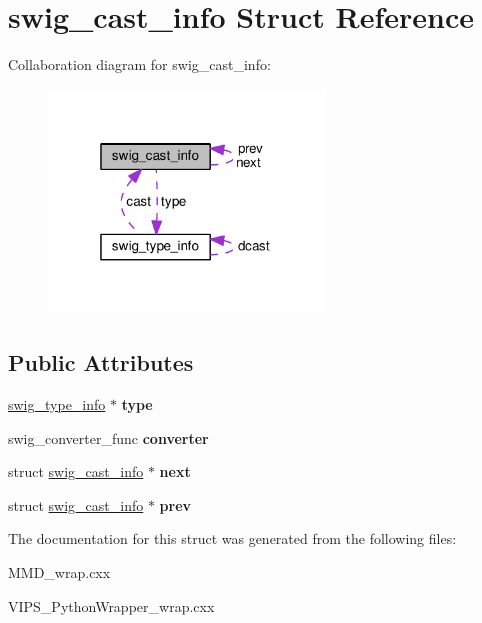 \hypertarget{structswig__cast__info}{}\section{swig\+\_\+cast\+\_\+info Struct Reference}
\label{structswig__cast__info}


Collaboration diagram for swig\+\_\+cast\+\_\+info\+:\nopagebreak
\begin{figure}[H]
\begin{center}
\leavevmode
\includegraphics[width=208pt]{structswig__cast__info__coll__graph}
\end{center}
\end{figure}
\subsection*{Public Attributes}
\begin{DoxyCompactItemize}
\item 
\hyperlink{structswig__type__info}{swig\+\_\+type\+\_\+info} $\ast$ {\bfseries type}\hypertarget{structswig__cast__info_a06b74832d16cc0c4fd147e4c39095cd9}{}\label{structswig__cast__info_a06b74832d16cc0c4fd147e4c39095cd9}

\item 
swig\+\_\+converter\+\_\+func {\bfseries converter}\hypertarget{structswig__cast__info_aa630fddfbb1bf9c97a03f9479ba32f76}{}\label{structswig__cast__info_aa630fddfbb1bf9c97a03f9479ba32f76}

\item 
struct \hyperlink{structswig__cast__info}{swig\+\_\+cast\+\_\+info} $\ast$ {\bfseries next}\hypertarget{structswig__cast__info_a2fc1b5702ec07bc23135df5c5db8e53e}{}\label{structswig__cast__info_a2fc1b5702ec07bc23135df5c5db8e53e}

\item 
struct \hyperlink{structswig__cast__info}{swig\+\_\+cast\+\_\+info} $\ast$ {\bfseries prev}\hypertarget{structswig__cast__info_a0f5d1fc81b494c3e032a153609fd3268}{}\label{structswig__cast__info_a0f5d1fc81b494c3e032a153609fd3268}

\end{DoxyCompactItemize}


The documentation for this struct was generated from the following files\+:\begin{DoxyCompactItemize}
\item 
M\+M\+D\+\_\+wrap.\+cxx\item 
V\+I\+P\+S\+\_\+\+Python\+Wrapper\+\_\+wrap.\+cxx\end{DoxyCompactItemize}

